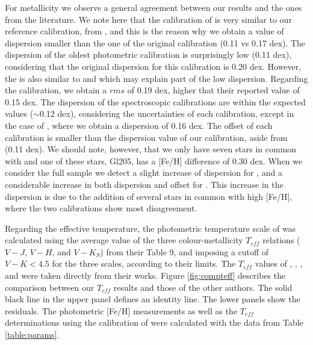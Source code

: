 \documentclass{aa}
\begin{document}
For metallicity we observe a general agreement between our results and the ones from the literature. We note here that the calibration of \citet{Schlaufman-2010} is very similar to our reference calibration, from \citet{Neves-2012}, and this is the reason why we obtain a value of dispersion smaller than the one of the original calibration (0.11 vs 0.17 dex). The dispersion of the oldest photometric calibration \citep{Bonfils-2005} is surprisingly low (0.11 dex), considering that the original dispersion for this calibration is 0.20 dex. However, the \citet{Bonfils-2005} is also similar to \citet{Schlaufman-2010} and \citet{Neves-2012} which may explain part of the low dispersion. Regarding the \citet{Johnson-2012} calibration, we obtain a $rms$ of 0.19 dex, higher that their reported value of 0.15 dex. The dispersion of the spectroscopic calibrations are within the expected values ($\sim$0.12 dex), considering the uncertainties of each calibration, except in the case of \citet{Mann-2013b}, where we obtain a dispersion of 0.16 dex. The offset of each calibration is smaller than the dispersion value of our calibration, aside from \citet{Mann-2013b} (0.11 dex). We should note, however, that we only have seven stars in common with \citet{Mann-2013b} and one of these stars, Gl205, has a [Fe/H] difference of 0.30 dex. When we consider the full sample we detect a slight increase of dispersion for \citet{Rojas-Ayala-2012}, and a considerable increase in both dispersion and offset for \citet{Newton-2013}. This increase in the \citet{Newton-2013} dispersion is due to the addition of several stars in common with high [Fe/H], where the two calibrations show most disagreement.  %

Regarding the effective temperature, the photometric temperature scale of \citet{Boyajian-2012} was calculated using the average value of the three colour-metallicity $T_{eff}$ relations ($V-J$, $V-H$, and $V-K_{S}$) from their Table 9, and imposing a cutoff of $V-K < 4.5$ for the three scales, according to their limits.  %
The $T_{eff}$ values of \citet{Rojas-Ayala-2012}, \citet{Onehag-2012}, \citet{Mann-2013a}, and \citet{Rajpurohit-2013a} were taken directly from their works. Figure \ref{fig:compteff} describes the comparison between our $T_{eff}$ results and those of the other authors. The solid black line in the upper panel defines an identity line. The lower panels show the residuals. %
The photometric [Fe/H] measurements as well as the $T_{eff}$ determinations using the calibration of \citet{Boyajian-2012} were calculated with the data from Table \ref{table:params}. 
\end{document}
